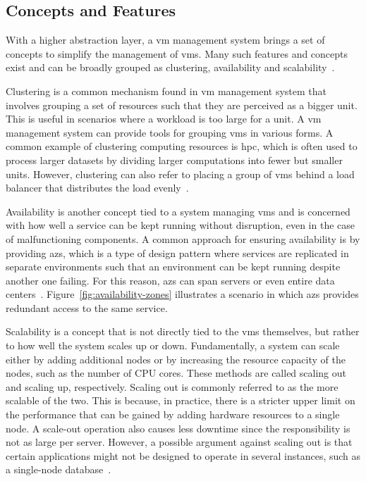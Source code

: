 \documentclass{kththesis}
\begin{document}
\subsection{Concepts and Features}
With a higher abstraction layer, a \Gls{vm} management system brings a set of concepts to simplify the management of \Glspl{vm}. Many such features and concepts exist and can be broadly grouped as clustering, availability and scalability\ \cite{cloudframeworks-and-hypervisors}. 

Clustering is a common mechanism found in \Gls{vm} management system that involves grouping a set of resources such that they are perceived as a bigger unit. This is useful in scenarios where a workload is too large for a unit. A \Gls{vm} management system can provide tools for grouping \Glspl{vm} in various forms. A common example of clustering computing resources is \Gls{hpc}, which is often used to process larger datasets by dividing larger computations into fewer but smaller units. However, clustering can also refer to placing a group of \Glspl{vm} behind a load balancer that distributes the load evenly\ \cite{google-hpc-overview,oracle-hpc-overview}. 

Availability is another concept tied to a system managing \Glspl{vm} and is concerned with how well a service can be kept running without disruption, even in the case of malfunctioning components. A common approach for ensuring availability is by providing \Glspl{az}, which is a type of design pattern where services are replicated in separate environments such that an environment can be kept running despite another one failing. For this reason, \Glspl{az} can span servers or even entire data centers\ \cite{cloudframeworks-and-hypervisors, azure-availability-zones}. Figure\ \ref{fig:availability-zones} illustrates a scenario in which \Glspl{az} provides redundant access to the same service. 

Scalability is a concept that is not directly tied to the \Glspl{vm} themselves, but rather to how well the system scales up or down. Fundamentally, a system can scale either by adding additional nodes or by increasing the resource capacity of the nodes, such as the number of CPU cores. These methods are called scaling out and scaling up, respectively. Scaling out is commonly referred to as the more scalable of the two. This is because, in practice, there is a stricter upper limit on the performance that can be gained by adding hardware resources to a single node. A scale-out operation also causes less downtime since the responsibility is not as large per server. However, a possible argument against scaling out is that certain applications might not be designed to operate in several instances, such as a single-node database\ \cite{scale-up-out-case-study, scale-up-out-ibm}.
\end{document}
